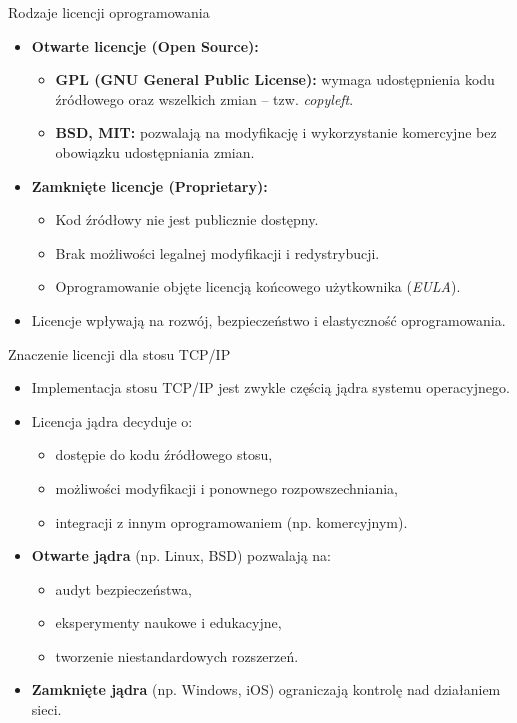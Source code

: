 \documentclass[aspectratio=169]{beamer}
\begin{document}
\begin{frame}{Rodzaje licencji oprogramowania}
  \begin{itemize}
    \item \textbf{Otwarte licencje (Open Source):}
    \begin{itemize}
      \item \textbf{GPL (GNU General Public License):} wymaga udostępnienia kodu źródłowego oraz wszelkich zmian – tzw. \textit{copyleft}.
      \item \textbf{BSD, MIT:} pozwalają na modyfikację i wykorzystanie komercyjne bez obowiązku udostępniania zmian.
    \end{itemize}
    \vspace{0.5em}
    \item \textbf{Zamknięte licencje (Proprietary):}
    \begin{itemize}
      \item Kod źródłowy nie jest publicznie dostępny.
      \item Brak możliwości legalnej modyfikacji i redystrybucji.
      \item Oprogramowanie objęte licencją końcowego użytkownika (\textit{EULA}).
    \end{itemize}
    \vspace{0.5em}
    \item Licencje wpływają na rozwój, bezpieczeństwo i elastyczność oprogramowania.
  \end{itemize}
\end{frame}

\begin{frame}{Znaczenie licencji dla stosu TCP/IP}
  \begin{itemize}
    \item Implementacja stosu TCP/IP jest zwykle częścią jądra systemu operacyjnego.
    \item Licencja jądra decyduje o:
    \begin{itemize}
      \item dostępie do kodu źródłowego stosu,
      \item możliwości modyfikacji i ponownego rozpowszechniania,
      \item integracji z innym oprogramowaniem (np. komercyjnym).
    \end{itemize}
    \vspace{0.5em}
    \item \textbf{Otwarte jądra} (np. Linux, BSD) pozwalają na:
    \begin{itemize}
      \item audyt bezpieczeństwa,
      \item eksperymenty naukowe i edukacyjne,
      \item tworzenie niestandardowych rozszerzeń.
    \end{itemize}
    \vspace{0.5em}
    \item \textbf{Zamknięte jądra} (np. Windows, iOS) ograniczają kontrolę nad działaniem sieci.
  \end{itemize}
\end{frame}
\end{document}
